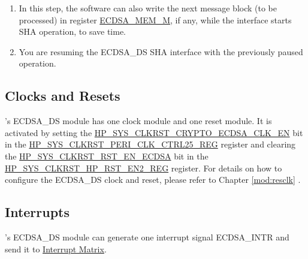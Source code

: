 \documentclass[main\_\_EN.tex]{subfiles}
\begin{document}
\begin{tiplisting}\label{others:ecdsa-note-sha}
\vspace{-2.5em}
\begin{enumerate}
\item In this step, the software can also write the next message block (to be processed) in register \hyperref[tab:ecdsa-memory]{ECDSA\_MEM\_M}, if any, while the interface starts SHA operation, to save time.
\item You are resuming the ECDSA\_DS SHA interface with the previously paused operation.
\end{enumerate}
\end{tiplisting}

\subsection{Clocks and Resets}

\chipname{}'s ECDSA\_DS module has one clock module and one reset module. It is activated by setting the \hyperref[fielddesc:HPSYSCLKRSTCRYPTOECDSACLKEN]{HP\_SYS\_CLKRST\_CRYPTO\_ECDSA\_CLK\_EN} bit in the \hyperref[regdesc:HPSYSCLKRSTPERICLKCTRL25REG]{HP\_SYS\_CLKRST\_PERI\_CLK\_CTRL25\_REG} register and clearing the \hyperref[fielddesc:HPSYSCLKRSTRSTENECDSA]{HP\_SYS\_CLKRST\_RST\_EN\_ECDSA} bit in the \hyperref[regdesc:HPSYSCLKRSTHPRSTEN2REG]{HP\_SYS\_CLKRST\_HP\_RST\_EN2\_REG} register. For details on how to configure the ECDSA\_DS clock and reset, please refer to Chapter \ref{mod:resclk} \textit{}.

\subsection{Interrupts}
\label{sec:ecdsa-interrupt}

\chipname{}'s ECDSA\_DS module can generate one interrupt signal ECDSA\_INTR and send it to \hyperref[mod:intmtrx]{Interrupt Matrix}.
\end{document}
